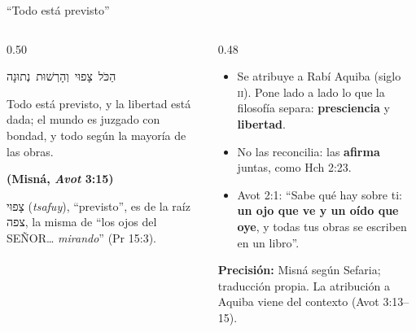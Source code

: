 \documentclass[hyperref={bookmarks=false},aspectratio=169]{beamer}
\newcommand{\heb}[1]{\mbox{\foreignlanguage{hebrew}{#1}}}
\newcommand{\SENOR}{S{\fontsize{0.78em}{1em}\selectfont EÑOR}}
\newcommand{\fuente}[1]{\par\hfill{\upshape\bfseries\footnotesize\textcolor{azul}{#1}}}
\newcommand{\destacar}[1]{\textbf{\textcolor{azul}{#1}}}
\newcommand{\precision}[1]{{\footnotesize\color{gris}\textbf{Precisión:} #1}}
\begin{document}
\begin{frame}{``Todo está previsto''}
\begin{columns}[t,onlytextwidth]
\begin{column}{0.50\textwidth}
\begin{center}\large\heb{הַכֹּל צָפוּי וְהָרְשׁוּת נְתוּנָה}\end{center}
\begin{cita}Todo está previsto, y la libertad está dada; el mundo es juzgado con bondad, y todo según la mayoría de las obras.\fuente{(Misná, \emph{Avot} 3:15)}\end{cita}
\scriptsize\heb{צָפוּי} (\emph{tsafuy}), ``previsto'', es de la raíz \heb{צפה}, la misma de ``los ojos del \SENOR{}\ldots{} \emph{mirando}'' (Pr 15:3).
\end{column}
\begin{column}{0.48\textwidth}\small
\begin{itemize}
\item Se atribuye a Rabí Aquiba (siglo \textsc{ii}). Pone lado a lado lo que la filosofía separa: \destacar{presciencia} y \destacar{libertad}.
\item No las reconcilia: las \destacar{afirma} juntas, como Hch 2:23.
\item Avot 2:1: ``Sabe qué hay sobre ti: \destacar{un ojo que ve y un oído que oye}, y todas tus obras se escriben en un libro''.
\end{itemize}
\precision{Misná según Sefaria; traducción propia. La atribución a Aquiba viene del contexto (Avot 3:13--15).}
\end{column}
\end{columns}
\end{frame}
\end{document}
